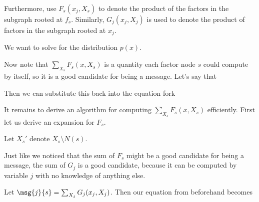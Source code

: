 \documentclass[12pt]{article}
\begin{document}
Furthermore, use $F_s(x_j, X_s)$ to denote the product of the factors in the subgraph rooted at $f_s$. Similarly, $G_j(x_j, X_j)$ is used to denote the product of factors in the subgraph rooted at $x_j$. 

We want to solve for the distribution $p(x)$.


Now note that $\sum_{X_s} F_s(x, X_s)$ is a quantity each factor node $s$ could compute by itself, so it is a good candidate for being a message. Let's say that


Then we can substitute this back into the equation fork

It remains to derive an algorithm for computing $\sum_{X_s} F_s(x, X_s)$ efficiently. First let us derive an expansion for $F_s$.


Let $X_s'$ denote $X_s \setminus N(s)$. 


Just like we noticed that the sum of $F_s$ might be a good candidate for being a message, the sum of $G_j$ is a good candidate, because it can be computed by variable $j$ with no knowledge of anything else.

Let $\msg{j}{s} = \sum_{X_j} G_j(x_j, X_j)$. Then our equation from beforehand becomes

\end{document}
